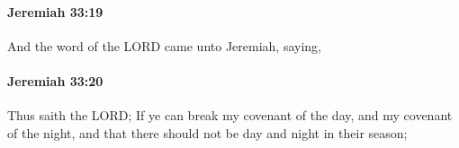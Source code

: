 		\paragraph{Jeremiah 33:19} %
			\label{JEREMIAH-33-19}

			And the word of the LORD came unto Jeremiah, saying,


		\paragraph{Jeremiah 33:20} %
			\label{JEREMIAH-33-20}

			Thus saith the LORD; If ye can break my covenant of the day, and my covenant of the night, and that there should not be day and night in their season;


